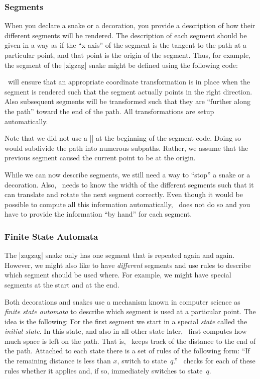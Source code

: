 \subsubsection{Segments}


When you declare a snake or a decoration, you provide a description 
of how their different segments will be rendered. The description of
each segment should be given in a way as if the ``x-axis'' of the
segment is the tangent to the path at a particular point,
and that point is the origin of the segment.
Thus, for example, the segment of the |zigzag| snake might be
defined using the following code: 
\begin{codeexample}
\pgfpathlineto{\pgfpoint{5pt}{5pt}}
\pgfpathlineto{\pgfpoint{15pt}{-5pt}}
\pgfpathlineto{\pgfpoint{20pt}{0pt}}
\end{codeexample}

\pgfname\ will ensure that an appropriate coordinate transformation
is in place when the segment is rendered such that
the segment actually points in the right direction. Also
subsequent segments will be transformed such that they are
``further along the path'' toward the end of the path.
All transformations are setup automatically.

Note that we did not use a |\pgfpathmoveto{\pgfpointorigin}| at the
beginning of the segment code. Doing so would subdivide the path into
numerous subpaths. Rather, we assume that the previous segment caused
the current point to be at the origin.

While we can now describe segments, we still need a way to ``stop''
a snake or a decoration. Also, \pgfname\ needs to know the width of 
the different segments such that it can translate and rotate the 
next segment correctly.
Even though it would be possible to compute all this information
automatically, \pgfname\ does not do so and you have to provide the
information ``by hand'' for each segment. 


\subsubsection{Finite State Automata}

The |zagzag| snake only has one segment that is repeated again and
again. However, we might also like to have \emph{different} segments
and use rules to describe which segment should be used where. For
example, we might have special segments at the start and at the end.

Both decorations and snakes use a mechanism known in computer science 
as \emph{finite state automata} to describe which segment is used at a
particular point. The idea is the following: For the first segment we
start in a special \emph{state} called the \emph{initial state}. In
this state, and also in all other state later, \pgfname\ first
computes how much space is left on the path. That is, \pgfname\ keeps
track of the distance to the end of the path. Attached to each state 
there is a set of rules of the following form: ``If the remaining 
distance is less than $x$, switch to state~$q$.'' \pgfname\ checks 
for each of these rules whether it applies and, if so, immediately 
switches to state~$q$.

